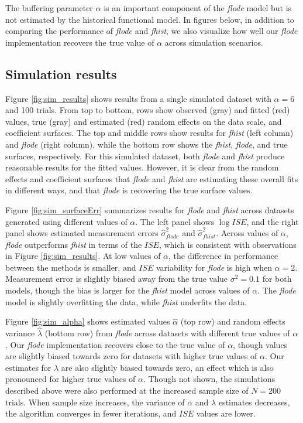 \documentclass[preprint]{JASA}
\begin{document}
The buffering parameter \(\alpha\) is an important component of the
\emph{flode} model but is not estimated by the historical functional
model. In figures below, in addition to comparing the performance of
\emph{flode} and \emph{fhist}, we also visualize how well our
\emph{flode} implementation recovers the true value of \(\alpha\) across
simulation scenarios.

\hypertarget{simulation-results}{%
\subsection{Simulation results}\label{simulation-results}}

Figure \ref{fig:sim_results} shows results from a single simulated
dataset with \(\alpha = 6\) and 100 trials. From top to bottom, rows
show observed (gray) and fitted (red) values, true (gray) and estimated
(red) random effects on the data scale, and coefficient surfaces. The
top and middle rows show results for \emph{fhist} (left column) and
\emph{flode} (right column), while the bottom row shows the
\emph{fhist}, \emph{flode}, and true surfaces, respectively. For this
simulated dataset, both \emph{flode} and \emph{fhist} produce reasonable
results for the fitted values. However, it is clear from the random
effects and coefficient surfaces that \emph{flode} and \emph{fhist} are
estimating these overall fits in different ways, and that \emph{flode}
is recovering the true surface values.

Figure \ref{fig:sim_surfaceErr} summarizes results for \emph{flode} and
\emph{fhist} across datasets generated using different values of
\(\alpha\). The left panel shows \(\log ISE\), and the right panel shows
estimated measurement errors \(\widehat{\sigma}^2_{flode}\) and
\(\widehat{\sigma}^2_{fhist}\). Across values of \(\alpha\),
\emph{flode} outperforms \emph{fhist} in terms of the \(ISE\), which is
consistent with observations in Figure \ref{fig:sim_results}. At low
values of \(\alpha\), the difference in performance between the methods
is smaller, and \(ISE\) variability for \emph{flode} is high when
\(\alpha = 2\). Measurement error is slightly biased away from the true
value \(\sigma^2 = 0.1\) for both models, though the bias is larger for
the \emph{fhist} model across values of \(\alpha\). The \emph{flode}
model is slightly overfitting the data, while \emph{fhist} underfits the
data.

Figure \ref{fig:sim_alpha} shows estimated values \(\widehat{\alpha}\)
(top row) and random effects variance \(\widehat{\lambda}\) (bottom row)
from \emph{flode} across datasets with different true values of
\(\alpha\). Our \emph{flode} implementation recovers close to the true
value of \(\alpha\), though values are slightly biased towards zero for
datasets with higher true values of \(\alpha\). Our estimates for
\(\lambda\) are also slightly biased towards zero, an effect which is
also pronounced for higher true values of \(\alpha\). Though not shown,
the simulations described above were also performed at the increased
sample size of \(N = 200\) trials. When sample size increases, the
variance of \(\alpha\) and \(\lambda\) estimates decreases, the
algorithm converges in fewer iterations, and \(ISE\) values are lower.
\end{document}

